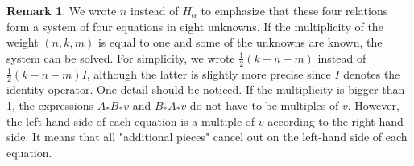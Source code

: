 \documentclass[twoside,a4paper,12pt]{article}
\theoremstyle{definition}
\newtheorem{remark}{Remark}
\begin{document}
\begin{remark}
	We wrote $n$ instead of $H_\alpha$ to emphasize that these four relations
	form a system of four equations in eight unknowns. If the multiplicity of
	the weight  $(n,k,m)$ is equal to one and some of the unknowns are known,
	the system can be solved.
	For simplicity, we wrote $\frac12(k-n-m)$ instead of $\frac12(k-n-m)I$, although the latter is slightly more precise since $I$ denotes the identity operator.
	One detail should be noticed. If the multiplicity is bigger than 1, the
	expressions $A_*B_*v$ and $B_*A_*v$ do not have to be multiples of $v$.
	However, the left-hand side of each equation is a multiple of $v$ according
	to the right-hand side. It means that all "additional pieces" cancel out
	on the left-hand side of each equation.
\end{remark}
\end{document}
